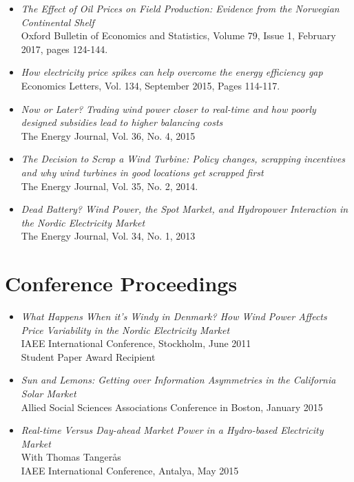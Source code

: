 \documentclass[margin]{res}
\begin{document}
\begin{resume}
\begin{itemize}
\item[] \emph{The Effect of Oil Prices on Field Production: Evidence from the Norwegian Continental Shelf}\\
Oxford Bulletin of Economics and Statistics, Volume 79, Issue 1, February 2017, pages 124-144.

\item[] \emph{How electricity price spikes can help overcome the energy efficiency gap}\\
Economics Letters, Vol. 134, September 2015, Pages 114-117.

\item[] \emph{Now or Later? Trading wind power closer to real-time and how poorly designed subsidies lead to higher balancing costs}\\
The Energy Journal, Vol. 36, No. 4, 2015

\item[] \emph{The Decision to Scrap a Wind Turbine: Policy changes, scrapping incentives and why wind turbines in good locations get scrapped first}\\
The Energy Journal, Vol. 35, No. 2, 2014.

\item[] \emph{Dead Battery? Wind Power, the Spot Market, and Hydropower Interaction in the Nordic Electricity Market}\\
The Energy Journal, Vol. 34, No. 1, 2013
\end{itemize}

\normalsize{\section{Conference Proceedings}}
\begin{itemize}
\setlength{\itemsep}{10pt}
\item[] \emph{What Happens When it's Windy in Denmark? How Wind Power Affects Price Variability in the Nordic Electricity Market}\\
IAEE International Conference, Stockholm, June 2011  \\
Student Paper Award Recipient

\item[] \emph {Sun and Lemons: Getting over Information Asymmetries in the California Solar Market} \\
Allied Social Sciences Associations Conference in Boston, January 2015

\item[] \emph{Real-time Versus Day-ahead Market Power in a Hydro-based Electricity Market} \\
With Thomas Tanger\aa s \\
IAEE International Conference, Antalya, May 2015


\end{itemize}
\end{resume}
\end{document}
